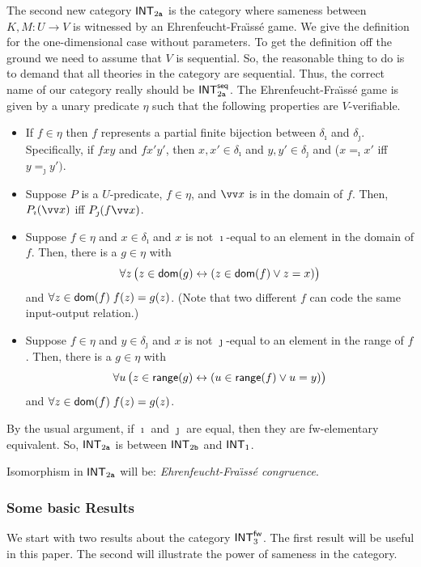 \documentclass{amsart}
\renewcommand{\iff}{\leftrightarrow}
\begin{document}
The second new category ${\sf INT}_{2{\tt a}}$ is the category where sameness
between $K,M: U \to V$ is witnessed by an Ehrenfeucht-Fra\"{\i}ss\'{e}  game. We give the definition
for the one-dimensional case without parameters. To get the definition off the
ground we need to assume that $V$ is sequential. So, the reasonable thing to
do is to demand that all theories in the category are sequential.
Thus, the correct name of our category really should be ${\sf INT}^{\sf seq}_{2{\tt a}}$.
The Ehrenfeucht-Fra\"{\i}ss\'{e}  game is given by a unary predicate $\eta$ such that the following properties
are $V$-verifiable.
\begin{itemize}
\item 
If $f\in \eta$ then $f$ represents a partial finite bijection between $\delta_\imath$ and $\delta_\jmath$.
Specifically, if $fxy$ and $fx'y'$, then $x,x' \in \delta_\imath$ and $y,y'\in \delta_\jmath$ and ($x=_\imath x'$ iff $y=_\jmath y')$.
    \item 
    Suppose $P$ is a $U$-predicate, $f\in \eta$, and $\vv x$ is in the domain of $f$.
    Then, $P_\imath(\vv x)$ iff $P_\jmath(f\vv x)$.
\item 
Suppose $f\in \eta$ and $x \in \delta_\imath$ and $x$ is not $\imath$-equal to an element in the domain of $f$. Then, there is a $g\in \eta$ with
\[\forall z \, \bigl(z\in {\sf dom}(g) \iff  (z\in {\sf dom}(f) \vee z=x)\bigr)\] and $\forall z\in {\sf dom}(f)\;f(z)=g(z)$.
(Note that two different $f$ can code the same input-output relation.)
    \item 
    Suppose $f\in \eta$ and $y \in \delta_\jmath$ and $x$ is not $\jmath$-equal to an element in the range of $f$. Then, there is a $g\in \eta$ with
\[\forall u \, \bigl(z\in {\sf range}(g) \iff  (u\in {\sf range}(f) \vee u=y)\bigr)\] and $\forall z\in {\sf dom}(f)\;f(z)=g(z)$.
\end{itemize}

By the usual argument, if $\imath$ and $\jmath$ are  equal, then they are {\sf fw}-elementary equivalent.
So, ${\sf INT}_{2{\tt a}}$ is between ${\sf INT}_{2{\tt b}}$ and ${\sf INT}_1$.

Isomorphism in ${\sf INT}_{2{\tt a}}$ will be: \emph{Ehrenfeucht-Fra\"{\i}ss\'{e} congruence}. 

\subsubsection{Some basic Results}

We start with two results about the category ${\sf INT}^{\sf fw}_3$. The first result will be useful in this paper.
The second will illustrate the power of sameness in the category.
\end{document}

